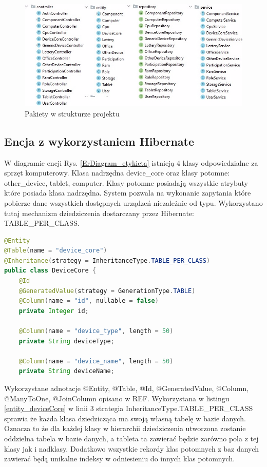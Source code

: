 \begin{figure}[h]
    \includegraphics[scale=1.0]{rys06/pakiety.jpg}
    \caption{Pakiety w strukturze projektu}
    \label{pakiety_etykieta}
\end{figure}

\newpage
\subsection {Encja z wykorzystaniem Hibernate}

W diagramie encji Rys. \ref{ErDiagram_etykieta} istnieją 4 klasy odpowiedzialne za sprzęt komputerowy. Klasa nadrzędna device\_core oraz klasy potomne: other\_device, tablet, computer. Klasy potomne posiadają wszystkie atrybuty które posiada klasa nadrzędna. System pozwala na wykonanie zapytania które pobierze dane wszystkich dostępnych urządzeń niezależnie od typu. Wykorzystano tutaj mechanizm dziedziczenia dostarczany przez Hibernate: TABLE\_PER\_CLASS.

\begin{lstlisting}[language=Java, style=JavaStyle, caption={Fragment klasy nadrzędnej DeviceCore}, label={entity_deviceCore}]
@Entity
@Table(name = "device_core")
@Inheritance(strategy = InheritanceType.TABLE_PER_CLASS)
public class DeviceCore {
    @Id
    @GeneratedValue(strategy = GenerationType.TABLE)
    @Column(name = "id", nullable = false)
    private Integer id;

    @Column(name = "device_type", length = 50)
    private String deviceType;

    @Column(name = "device_name", length = 50)
    private String deviceName;

\end{lstlisting}

Wykorzystane adnotacje @Entity, @Table, @Id, @GeneratedValue, @Column, @ManyToOne, @JoinColumn opisano w REF. Wykorzystana w listingu \ref{entity_deviceCore} w linii 3 strategia InheritanceType.TABLE\_PER\_CLASS sprawia że każda klasa dziedzicząca ma swoją własną tabelę  w bazie danych. Oznacza to że dla każdej klasy w hierarchii dziedziczenia utworzona zostanie oddzielna tabela w bazie danych, a tableta ta zawierać będzie zarówno pola z tej klasy jak i nadklasy. Dodatkowo wszystkie rekordy klas potomnych z baz danych zawierać będą unikalne indeksy w odniesieniu do innych klas potomnych.

